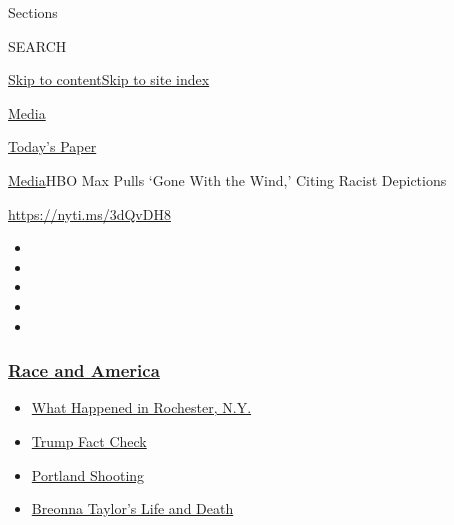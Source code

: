 Sections

SEARCH

\protect\hyperlink{site-content}{Skip to
content}\protect\hyperlink{site-index}{Skip to site index}

\href{https://www.nytimes3xbfgragh.onion/section/business/media}{Media}

\href{https://myaccount.nytimes3xbfgragh.onion/auth/login?response_type=cookie\&client_id=vi}{}

\href{https://www.nytimes3xbfgragh.onion/section/todayspaper}{Today's
Paper}

\href{/section/business/media}{Media}\textbar{}HBO Max Pulls `Gone With
the Wind,' Citing Racist Depictions

\url{https://nyti.ms/3dQvDH8}

\begin{itemize}
\item
\item
\item
\item
\item
\end{itemize}

\hypertarget{race-and-america}{%
\subsubsection{\texorpdfstring{\href{https://www.nytimes3xbfgragh.onion/news-event/george-floyd-protests-minneapolis-new-york-los-angeles?name=styln-george-floyd\&region=TOP_BANNER\&block=storyline_menu_recirc\&action=click\&pgtype=Article\&impression_id=f70e7b00-f2c2-11ea-bed5-59d648497bed\&variant=undefined}{Race
and America}}{Race and America}}\label{race-and-america}}

\begin{itemize}
\tightlist
\item
  \href{https://www.nytimes3xbfgragh.onion/2020/09/04/nyregion/rochester-police-daniel-prude.html?name=styln-george-floyd\&region=TOP_BANNER\&block=storyline_menu_recirc\&action=click\&pgtype=Article\&impression_id=f70e7b01-f2c2-11ea-bed5-59d648497bed\&variant=undefined}{What
  Happened in Rochester, N.Y.}
\item
  \href{https://www.nytimes3xbfgragh.onion/2020/09/01/us/politics/trump-fact-check-protests.html?name=styln-george-floyd\&region=TOP_BANNER\&block=storyline_menu_recirc\&action=click\&pgtype=Article\&impression_id=f70e7b02-f2c2-11ea-bed5-59d648497bed\&variant=undefined}{Trump
  Fact Check}
\item
  \href{https://www.nytimes3xbfgragh.onion/2020/08/30/us/portland-shooting-explained.html?name=styln-george-floyd\&region=TOP_BANNER\&block=storyline_menu_recirc\&action=click\&pgtype=Article\&impression_id=f70e7b03-f2c2-11ea-bed5-59d648497bed\&variant=undefined}{Portland
  Shooting}
\item
  \href{https://www.nytimes3xbfgragh.onion/2020/08/30/us/breonna-taylor-police-killing.html?name=styln-george-floyd\&region=TOP_BANNER\&block=storyline_menu_recirc\&action=click\&pgtype=Article\&impression_id=f70e7b04-f2c2-11ea-bed5-59d648497bed\&variant=undefined}{Breonna
  Taylor's Life and Death}
\end{itemize}

